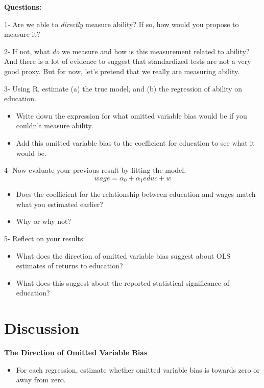 \documentclass[
]{book}
\providecommand{\tightlist}{%
  \setlength{\itemsep}{0pt}\setlength{\parskip}{0pt}}
\theoremstyle{definition}
\theoremstyle{definition}
\theoremstyle{definition}
\theoremstyle{definition}
\theoremstyle{remark}
\begin{document}
\textbf{Questions:}

1- Are we able to \emph{directly} measure ability? If so, how would you propose to measure it?

2- If not, what \emph{do} we measure and how is this measurement related to ability? And there is a lot of evidence to suggest that standardized tests are not a very good proxy. But for now, let's pretend that we really are measuring ability.

3- Using R, estimate (a) the true model, and (b) the regression of ability on education.

\begin{itemize}
\item
  Write down the expression for what omitted variable bias would be if you couldn't measure ability.
\item
  Add this omitted variable bias to the coefficient for education to see what it would be.
\end{itemize}

4- Now evaluate your previous result by fitting the model, \[wage = \alpha_0 + \alpha_1 educ + w\]

\begin{itemize}
\item
  Does the coefficient for the relationship between education and wages match what you estimated earlier?
\item
  Why or why not?
\end{itemize}

5- Reflect on your results:

\begin{itemize}
\item
  What does the direction of omitted variable bias suggest about OLS estimates of returns to education?
\item
  What does this suggest about the reported statistical significance of education?
\end{itemize}

\hypertarget{discussion-2}{%
\section{Discussion}\label{discussion-2}}

\textbf{The Direction of Omitted Variable Bias}

\begin{itemize}
\tightlist
\item
  For each regression, estimate whether omitted variable bias is towards zero or away from zero.
\end{itemize}
\end{document}
